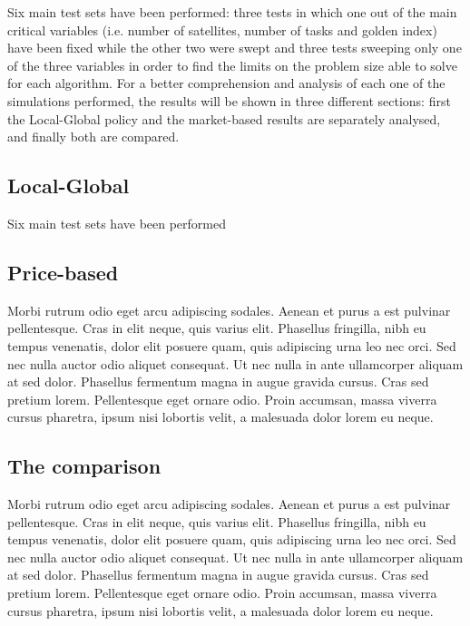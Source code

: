 Six main test sets have been performed: three tests in which one out of the main critical variables (i.e. number of satellites, number of tasks and golden index) have been fixed while the other two were swept and three tests sweeping only one of the three variables in order to find the limits on the problem size able to solve for each algorithm. For a better comprehension and analysis of each one of the simulations performed, the results will be shown in three different sections: first the Local-Global policy and the market-based results are separately analysed, and finally both are compared.

\subsection{Local-Global}

Six main test sets have been performed


\subsection{Price-based}
Morbi rutrum odio eget arcu adipiscing sodales. Aenean et purus a est pulvinar pellentesque. Cras in elit neque, quis varius elit. Phasellus fringilla, nibh eu tempus venenatis, dolor elit posuere quam, quis adipiscing urna leo nec orci. Sed nec nulla auctor odio aliquet consequat. Ut nec nulla in ante ullamcorper aliquam at sed dolor. Phasellus fermentum magna in augue gravida cursus. Cras sed pretium lorem. Pellentesque eget ornare odio. Proin accumsan, massa viverra cursus pharetra, ipsum nisi lobortis velit, a malesuada dolor lorem eu neque.


\subsection{The comparison}
Morbi rutrum odio eget arcu adipiscing sodales. Aenean et purus a est pulvinar pellentesque. Cras in elit neque, quis varius elit. Phasellus fringilla, nibh eu tempus venenatis, dolor elit posuere quam, quis adipiscing urna leo nec orci. Sed nec nulla auctor odio aliquet consequat. Ut nec nulla in ante ullamcorper aliquam at sed dolor. Phasellus fermentum magna in augue gravida cursus. Cras sed pretium lorem. Pellentesque eget ornare odio. Proin accumsan, massa viverra cursus pharetra, ipsum nisi lobortis velit, a malesuada dolor lorem eu neque.